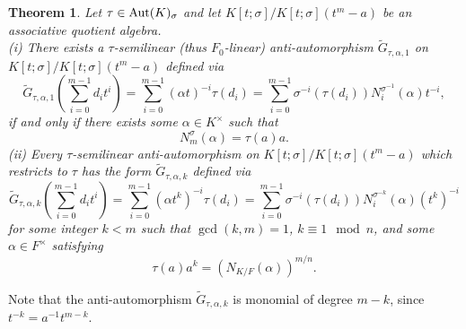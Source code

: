 \documentclass{amsart}
\theoremstyle{plain}
\newtheorem{theorem}{Theorem}[section]
\theoremstyle{definition}
\numberwithin{equation}{section}
\numberwithin{figure}{section}
\begin{document}
\begin{theorem}\label{thm:main0}
 Let   $\tau \in {\rm Aut}(K)_\sigma$ and let $K[t;\sigma]/K[t;\sigma](t^m-a)$ be an  associative quotient algebra.
\\ (i) There exists a $\tau$-semilinear (thus $F_0$-linear) anti-automorphism $\widetilde G_{\tau,\alpha,1}$ on $K[t;\sigma]/K[t;\sigma](t^m-a)$ defined via
$$\widetilde G_{\tau,\alpha,1}(\sum_{i=0}^{m-1}d_it^i)=\sum_{i=0}^{m-1}(\alpha t)^{-i} \tau(d_i) = \sum_{i=0}^{m-1}\sigma^{-i}(\tau(d_i) ) N_i^{\sigma^{-1}}(\alpha) t^{-i},$$
 if and only if  there exists  some $\alpha\in K^\times$ such that
$$N_{m}^\sigma( \alpha)= \tau(a)a.$$
(ii) Every $\tau$-semilinear  anti-automorphism on $K[t;\sigma]/K[t;\sigma](t^m-a)$ which restricts  to  $\tau$ has the form $\widetilde G_{\tau,\alpha,k} $ defined via
$$\widetilde G_{\tau,\alpha,k}(\sum_{i=0}^{m-1}d_it^i)= \sum_{i=0}^{m-1} (\alpha t^k)^{-i}\tau(d_i) =\sum_{i=0}^{m-1} \sigma^{-i}(\tau(d_i) ) N_i^{\sigma^{-k}}(\alpha) (t^{k})^{-i}$$
for some integer $k<m$ such that $\gcd(k,m)=1$, $k\equiv 1 \mod n$, and some $\alpha\in F^\times$ satisfying $$\tau(a) a^{k}=(N_{K/F}(\alpha))^{m/n}.$$
\end{theorem}

Note that the anti-automorphism $\widetilde G_{\tau,\alpha,k}$ is monomial of degree $m-k$, since $t^{-k}=a^{-1}t^{m-k}$.
\end{document}
